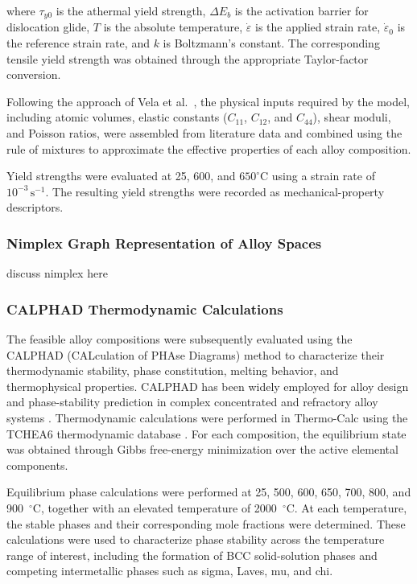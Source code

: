 \vspace{0.5em}

where $\tau_{y0}$ is the athermal yield strength, $\Delta E_b$ is the activation barrier for dislocation glide, $T$ is the absolute temperature, $\dot{\varepsilon}$ is the applied strain rate, $\dot{\varepsilon}_0$ is the reference strain rate, and $k$ is Boltzmann's constant. The corresponding tensile yield strength was obtained through the appropriate Taylor-factor conversion.

Following the approach of Vela et al.~\cite{vela2023data}, the physical inputs required by the model, including atomic volumes, elastic constants ($C_{11}$, $C_{12}$, and $C_{44}$), shear moduli, and Poisson ratios, were assembled from literature data and combined using the rule of mixtures to approximate the effective properties of each alloy composition.

Yield strengths were evaluated at 25, 600, and $650^{\circ}\mathrm{C}$ using a strain rate of $10^{-3}\,\mathrm{s}^{-1}$. The resulting yield strengths were recorded as mechanical-property descriptors.

\subsubsection{Nimplex Graph Representation of Alloy Spaces}

discuss nimplex here 

\subsubsection{CALPHAD Thermodynamic Calculations}

The feasible alloy compositions were subsequently evaluated using the CALPHAD (CALculation of PHAse Diagrams) method to characterize their thermodynamic stability, phase constitution, melting behavior, and thermophysical properties. CALPHAD has been widely employed for alloy design and phase-stability prediction in complex concentrated and refractory alloy systems \cite{li2023calphad,conway2022thermodynamic}. Thermodynamic calculations were performed in Thermo-Calc using the TCHEA6 thermodynamic database \cite{TCHEA6}. For each composition, the equilibrium state was obtained through Gibbs free-energy minimization over the active elemental components.

Equilibrium phase calculations were performed at 25, 500, 600, 650, 700, 800, and 900~$^{\circ}\mathrm{C}$, together with an elevated temperature of 2000~$^{\circ}\mathrm{C}$. At each temperature, the stable phases and their corresponding mole fractions were determined. These calculations were used to characterize phase stability across the temperature range of interest, including the formation of BCC solid-solution phases and competing intermetallic phases such as sigma, Laves, mu, and chi.

